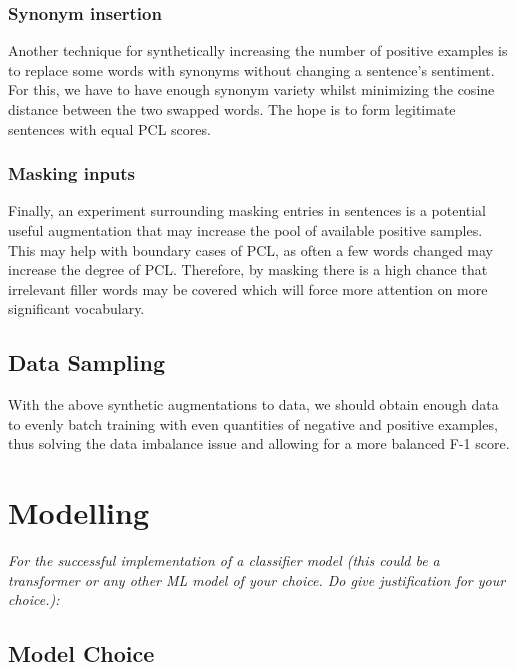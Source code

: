 \documentclass[11pt,a4paper]{article}
\begin{document}
\subsubsection{Synonym insertion}


Another technique for synthetically increasing the number of positive examples is to replace some words with synonyms without changing a sentence's sentiment. For this, we have to have enough synonym variety whilst minimizing the cosine distance between the two swapped words. The hope is to form legitimate sentences with equal PCL scores.

\subsubsection{Masking inputs}

Finally, an experiment surrounding masking entries in sentences is a potential useful augmentation that may increase the pool of available positive samples. This may help with boundary cases of PCL, as often a few words changed may increase the degree of PCL. Therefore, by masking there is a high chance that irrelevant filler words may be covered which will force more attention on more significant vocabulary. 

\subsection{Data Sampling}

With the above synthetic augmentations to data, we should obtain enough data to evenly batch training with even quantities of negative and positive examples, thus solving the data imbalance issue and allowing for a more balanced F-1 score.

\section{Modelling}\label{sect:model}

\emph{For the successful implementation of a classifier model (this could be a transformer or any other ML model of your choice. Do give justification for your choice.):}

\subsection{Model Choice}
\end{document}
